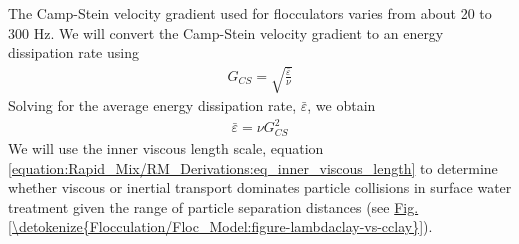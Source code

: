\documentclass[letterpaper,10pt,english]{sphinxmanual}
\begin{document}
The Camp-Stein velocity gradient used for flocculators varies from about 20 to 300 Hz. We will convert the Camp-Stein velocity gradient to an energy dissipation rate using
\begin{equation}\label{equation:Flocculation/Floc_Model:Flocculation/Floc_Model:0}
\begin{split}G_{CS} = \sqrt{\frac{\bar \varepsilon}{\nu}}\end{split}
\end{equation}
Solving for the average energy dissipation rate, \(\bar \varepsilon\), we obtain
\begin{equation}\label{equation:Flocculation/Floc_Model:Flocculation/Floc_Model:1}
\begin{split}\bar \varepsilon = \nu G_{CS}^2\end{split}
\end{equation}
We will use the inner viscous length scale, equation \eqref{equation:Rapid_Mix/RM_Derivations:eq_inner_viscous_length} to determine whether viscous or inertial transport dominates particle collisions in surface water treatment given the range of particle separation distances (see \hyperref[\detokenize{Flocculation/Floc_Model:figure-lambdaclay-vs-cclay}]{Fig.\@ \ref{\detokenize{Flocculation/Floc_Model:figure-lambdaclay-vs-cclay}}}).
\end{document}
